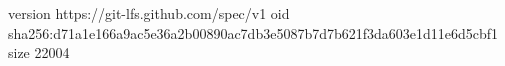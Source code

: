 version https://git-lfs.github.com/spec/v1
oid sha256:d71a1e166a9ac5e36a2b00890ac7db3e5087b7d7b621f3da603e1d11e6d5cbf1
size 22004

